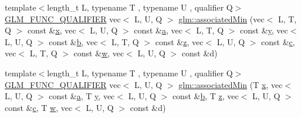 \begin{DoxyCompactItemize}
\item 
{\footnotesize template$<$length\+\_\+t L, typename T , typename U , qualifier Q$>$ }\\\mbox{\hyperlink{setup_8hpp_a33fdea6f91c5f834105f7415e2a64407}{G\+L\+M\+\_\+\+F\+U\+N\+C\+\_\+\+Q\+U\+A\+L\+I\+F\+I\+ER}} vec$<$ L, U, Q $>$ \mbox{\hyperlink{group__gtx__associated__min__max_ga66b08118bc88f0494bcacb7cdb940556}{glm\+::associated\+Min}} (vec$<$ L, T, Q $>$ const \&\mbox{\hyperlink{_s_d_l__opengl_8h_ad0e63d0edcdbd3d79554076bf309fd47}{x}}, vec$<$ L, U, Q $>$ const \&\mbox{\hyperlink{_s_d_l__opengl__glext_8h_a3309789fc188587d666cda5ece79cf82}{a}}, vec$<$ L, T, Q $>$ const \&\mbox{\hyperlink{_s_d_l__opengl_8h_a1675d9d7bb68e1657ff028643b4037e3}{y}}, vec$<$ L, U, Q $>$ const \&\mbox{\hyperlink{_s_d_l__opengl__glext_8h_a0f71581a41fd2264c8944126dabbd010}{b}}, vec$<$ L, T, Q $>$ const \&\mbox{\hyperlink{_s_d_l__opengl__glext_8h_a5e74030ebb3297ce1b37ff716fedd68f}{z}}, vec$<$ L, U, Q $>$ const \&\mbox{\hyperlink{_s_d_l__opengl__glext_8h_a1f2d7f8147412c43ba2303a56f97ee73}{c}}, vec$<$ L, T, Q $>$ const \&\mbox{\hyperlink{_s_d_l__opengl__glext_8h_a6ee8f168a7ab6785a9bb57c6715dad99}{w}}, vec$<$ L, U, Q $>$ const \&d)
\item 
{\footnotesize template$<$length\+\_\+t L, typename T , typename U , qualifier Q$>$ }\\\mbox{\hyperlink{setup_8hpp_a33fdea6f91c5f834105f7415e2a64407}{G\+L\+M\+\_\+\+F\+U\+N\+C\+\_\+\+Q\+U\+A\+L\+I\+F\+I\+ER}} vec$<$ L, U, Q $>$ \mbox{\hyperlink{group__gtx__associated__min__max_ga78c28fde1a7080fb7420bd88e68c6c68}{glm\+::associated\+Min}} (T \mbox{\hyperlink{_s_d_l__opengl_8h_ad0e63d0edcdbd3d79554076bf309fd47}{x}}, vec$<$ L, U, Q $>$ const \&\mbox{\hyperlink{_s_d_l__opengl__glext_8h_a3309789fc188587d666cda5ece79cf82}{a}}, T \mbox{\hyperlink{_s_d_l__opengl_8h_a1675d9d7bb68e1657ff028643b4037e3}{y}}, vec$<$ L, U, Q $>$ const \&\mbox{\hyperlink{_s_d_l__opengl__glext_8h_a0f71581a41fd2264c8944126dabbd010}{b}}, T \mbox{\hyperlink{_s_d_l__opengl__glext_8h_a5e74030ebb3297ce1b37ff716fedd68f}{z}}, vec$<$ L, U, Q $>$ const \&\mbox{\hyperlink{_s_d_l__opengl__glext_8h_a1f2d7f8147412c43ba2303a56f97ee73}{c}}, T \mbox{\hyperlink{_s_d_l__opengl__glext_8h_a6ee8f168a7ab6785a9bb57c6715dad99}{w}}, vec$<$ L, U, Q $>$ const \&d)
\item 

\end{DoxyCompactItemize}

